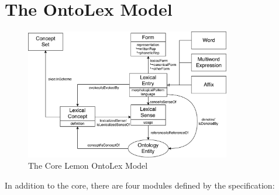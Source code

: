 \documentclass[12pt,a4paper]{elex2017}
\begin{document}
\section{The OntoLex Model}

\begin{figure}
    \begin{center}
\includegraphics[width=0.8\textwidth]{LemonOntoLexCore.pdf}
    \end{center}
\caption{\label{fig:core}The Core Lemon OntoLex Model}
\end{figure}


In addition to the core, there are four modules defined by the specification:
\end{document}
